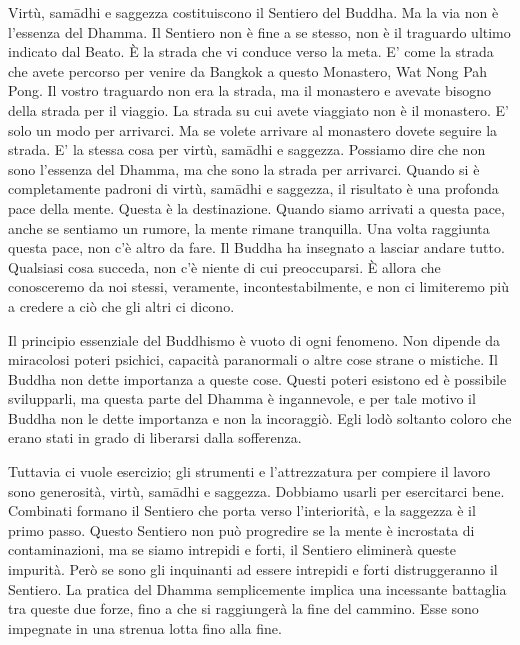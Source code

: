 Virtù, samādhi e saggezza costituiscono il Sentiero del Buddha. Ma la
via non è l'essenza del Dhamma. Il Sentiero non è fine a se stesso, non
è il traguardo ultimo indicato dal Beato. È la strada che vi conduce
verso la meta. E' come la strada che avete percorso per venire da
Bangkok a questo Monastero, Wat Nong Pah Pong. Il vostro traguardo non
era la strada, ma il monastero e avevate bisogno della strada per il
viaggio. La strada su cui avete viaggiato non è il monastero. E' solo un
modo per arrivarci. Ma se volete arrivare al monastero dovete seguire la
strada. E' la stessa cosa per virtù, samādhi e saggezza. Possiamo dire
che non sono l'essenza del Dhamma, ma che sono la strada per arrivarci.
Quando si è completamente padroni di virtù, samādhi e saggezza, il
risultato è una profonda pace della mente. Questa è la destinazione.
Quando siamo arrivati a questa pace, anche se sentiamo un rumore, la
mente rimane tranquilla. Una volta raggiunta questa pace, non c'è altro
da fare. Il Buddha ha insegnato a lasciar andare tutto. Qualsiasi cosa
succeda, non c'è niente di cui preoccuparsi. È allora che conosceremo da
noi stessi, veramente, incontestabilmente, e non ci limiteremo più a
credere a ciò che gli altri ci dicono.

Il principio essenziale del Buddhismo è vuoto di ogni fenomeno. Non
dipende da miracolosi poteri psichici, capacità paranormali o altre cose
strane o mistiche. Il Buddha non dette importanza a queste cose. Questi
poteri esistono ed è possibile svilupparli, ma questa parte del Dhamma è
ingannevole, e per tale motivo il Buddha non le dette importanza e non
la incoraggiò. Egli lodò soltanto coloro che erano stati in grado di
liberarsi dalla sofferenza.

Tuttavia ci vuole esercizio; gli strumenti e l'attrezzatura per compiere
il lavoro sono generosità, virtù, samādhi e saggezza. Dobbiamo usarli
per esercitarci bene. Combinati formano il Sentiero che porta verso
l'interiorità, e la saggezza è il primo passo. Questo Sentiero non può
progredire se la mente è incrostata di contaminazioni, ma se siamo
intrepidi e forti, il Sentiero eliminerà queste impurità. Però se sono
gli inquinanti ad essere intrepidi e forti distruggeranno il Sentiero.
La pratica del Dhamma semplicemente implica una incessante battaglia tra
queste due forze, fino a che si raggiungerà la fine del cammino. Esse
sono impegnate in una strenua lotta fino alla fine.


